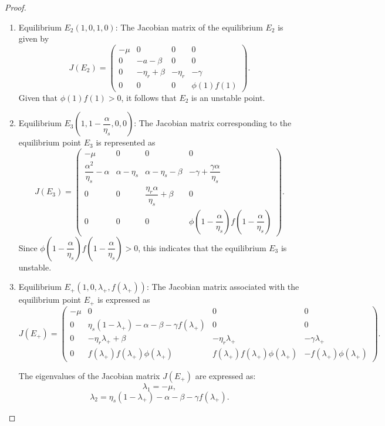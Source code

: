 \begin{proof}
\	\begin{enumerate}
		\item Equilibrium \(E_{2}(1,0,1,0)\):  
		The Jacobian matrix of the equilibrium \(E_{2}\) is given by  
		\[
		J(E_{2}) = \begin{pmatrix} 
			-\mu & 0 & 0 & 0 \\ 
			0 & -a-\beta & 0 & 0 \\ 
			0 & -\eta_{r} + \beta & -\eta_{r} & -\gamma \\ 
			0 & 0 & 0 & \phi(1)f(1) 
		\end{pmatrix}.
		\]
		Given that \(\phi(1)f(1)>0\), it follows that \(E_{2}\) is an unstable point.
		
		\item Equilibrium \(E_{3}\left(1,1-\dfrac{\alpha}{\eta_{s}},0,0\right)\):  
		The Jacobian matrix corresponding to the equilibrium point \(E_{3}\) is represented as  
		\[
		J(E_{3}) = \begin{pmatrix} 
			-\mu & 0 & 0 & 0 \\ 
			\dfrac{\alpha^{2}}{\eta_{s}} - \alpha & \alpha - \eta_{s} & \alpha - \eta_{s} - \beta & -\gamma + \dfrac{\gamma\alpha}{\eta_{s}} \\ 
			0 & 0 & \dfrac{\eta_{r}\alpha}{\eta_{s}} + \beta & 0 \\ 
			0 & 0 & 0 & \phi\left(1-\dfrac{\alpha}{\eta_{s}}\right)f\left(1-\dfrac{\alpha}{\eta_{s}}\right) 
		\end{pmatrix}.
		\]
		Since \(\phi\left(1-\dfrac{\alpha}{\eta_{s}}\right)f\left(1-\dfrac{\alpha}{\eta_{s}}\right)>0\), this indicates that the equilibrium \(E_{3}\) is unstable.
		\item Equilibrium \(E_{+}(1,0,\lambda_{+},f(\lambda_{+}))\): The Jacobian matrix associated with the equilibrium point \(E_{+}\) is expressed as
		$$
		J(E_{+}) = \begin{pmatrix}
			-\mu & 0 & 0 & 0 \\ 
			0 & \eta_{s}(1-\lambda_{+})-\alpha-\beta-\gamma f(\lambda_{+}) & 0 & 0 \\ 
			0 & -\eta_{r}\lambda_{+} + \beta & -\eta_{r}\lambda_{+} & -\gamma\lambda_{+} \\ 
			0 & f(\lambda_{+})f(\lambda_{+})\phi(\lambda_{+}) & f(\lambda_{+})f(\lambda_{+})\phi(\lambda_{+}) & -f(\lambda_{+})\phi(\lambda_{+})
		\end{pmatrix}.
		$$
		
		The eigenvalues of the Jacobian matrix \(J(E_{+})\) are expressed as:
		\[
		\lambda_{1} = -\mu,
		\]
		\[
		\lambda_{2} = \eta_{s}(1-\lambda_{+})-\alpha-\beta-\gamma f(\lambda_{+}).
		\]
		

\end{enumerate}
\end{proof}
